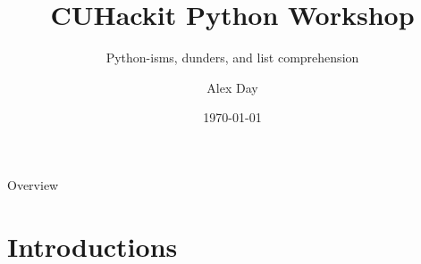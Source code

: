 \documentclass[aspectratio=169,xcolor=dvipsnames]{beamer}
\title[short title]{CUHackit Python Workshop} %
\subtitle{Python-isms, dunders, and list comprehension}
\author[Day]{Alex Day}
\institute[CU] %
{
  Ph.D. Student\\
  School of Computing\\
  Clemson University%
}
\date{\today} %
\begin{document}
\begin{frame}
    \titlepage
\end{frame}

\begin{frame}{Overview}
    \tableofcontents
\end{frame}

\section{Introductions}
\end{document}
